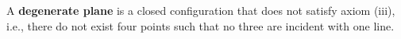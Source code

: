 A \textbf{degenerate plane} is a closed configuration that does not satisfy axiom (iii), i.e., there do not exist four points such that no three are incident with one line.

